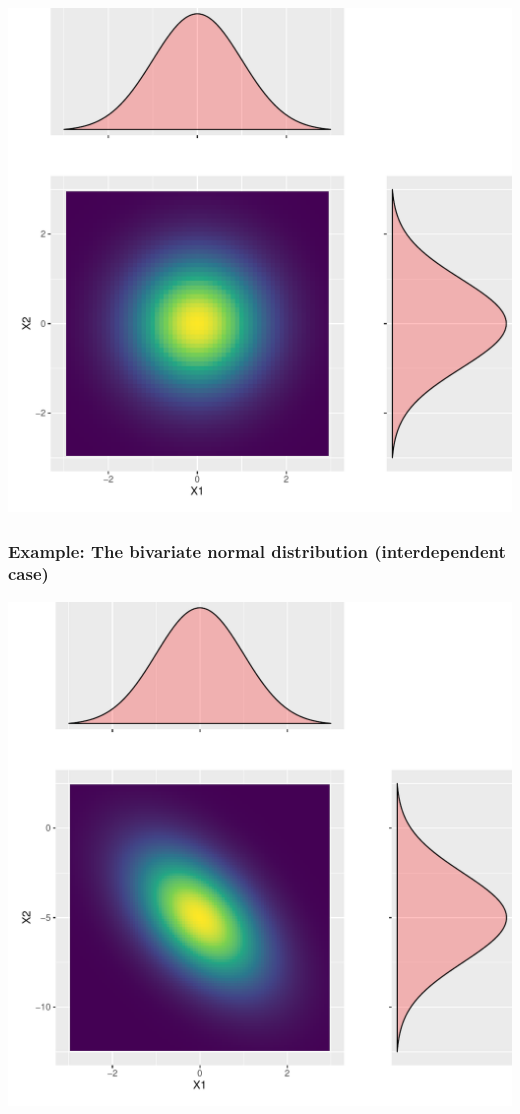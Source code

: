 \documentclass[
  11pt,
]{article}
\begin{document}
\begin{center}\includegraphics{01-01-lec_files/figure-latex/bvnnorm-2-1} \end{center}

\hypertarget{example-the-bivariate-normal-distribution-interdependent-case}{%
\subsubsection{Example: The bivariate normal distribution (interdependent case)}\label{example-the-bivariate-normal-distribution-interdependent-case}}

\begin{center}\includegraphics{01-01-lec_files/figure-latex/bvnnorm-3-1} \end{center}
\end{document}
